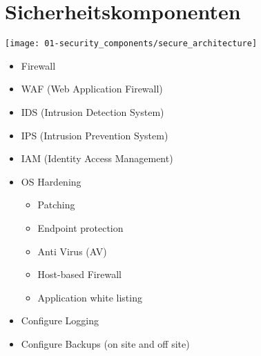 

\section{Sicherheitskomponenten}

\begin{center}
    \vspace{-8pt}
    \texttt{[image: 01-security\_components/secure\_architecture]}
    \vspace{-8pt}
\end{center}

\begin{itemize}
    \item Firewall
    \item WAF (Web Application Firewall)
    \item IDS (Intrusion Detection System)
    \item IPS (Intrusion Prevention System)
    \item IAM (Identity Access Management)
    \item OS Hardening
    \begin{itemize}
        \item Patching
        \item Endpoint protection
        \item Anti Virus (AV)
        \item Host-based Firewall
        \item Application white listing
    \end{itemize}
    \item Configure Logging
    \item Configure Backups (on site and off site)
\end{itemize}

